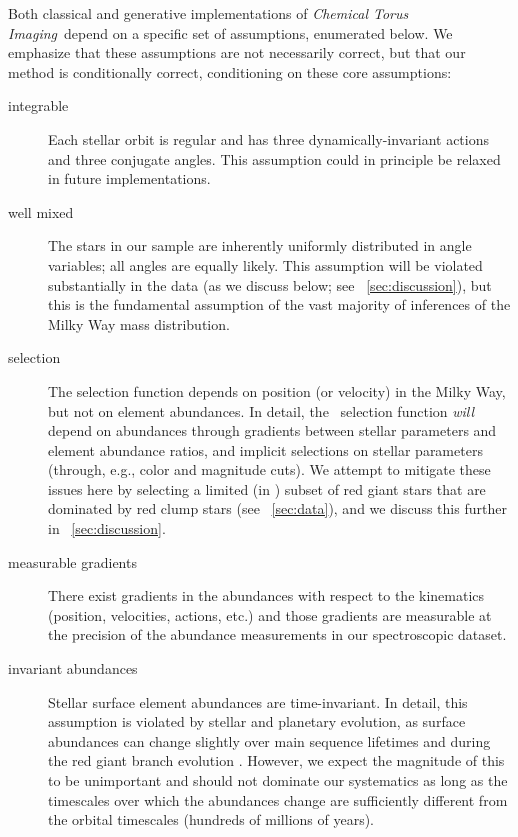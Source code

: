 \documentclass[modern]{aastex63}
\newcommand{\methodname}{\textsl{Chemical Torus Imaging}}
\newcommand{\apogee}{\acronym{APOGEE}}
\begin{document}
Both classical and generative implementations of \methodname\ depend on a
specific set of assumptions, enumerated below.
We emphasize that these assumptions are not necessarily correct, but that our
method is conditionally correct, conditioning on these core assumptions:
\begin{description}
\item[integrable] Each stellar orbit is regular and has three
  dynamically-invariant actions and three conjugate angles. This assumption
  could in principle be relaxed in future implementations.
\item[well mixed] The stars in our sample are inherently uniformly distributed
  in angle variables; all angles are equally likely. This assumption will be
  violated substantially in the data (as we discuss below; see
  \sectionname~\ref{sec:discussion}), but this is the fundamental assumption of
  the vast majority of inferences of the Milky Way mass distribution.
\item[selection] The selection function depends on position (or velocity) in the
  Milky Way, but not on element abundances. In detail, the \apogee\ selection
  function \emph{will} depend on abundances through gradients between stellar
  parameters and element abundance ratios, and implicit selections on stellar
  parameters (through, e.g., color and magnitude cuts). We attempt to mitigate
  these issues here by selecting a limited (in \logg) subset of red giant stars
  that are dominated by red clump stars (see \sectionname~\ref{sec:data}), and
  we discuss this further in \sectionname~\ref{sec:discussion}.
\item[measurable gradients] There exist gradients in the abundances with respect
  to the kinematics (position, velocities, actions, etc.) and those gradients
  are measurable at the precision of the abundance measurements in our
  spectroscopic dataset.
\item[invariant abundances] Stellar surface element abundances are
  time-invariant. In detail, this assumption is violated by stellar and
  planetary evolution, as surface abundances can change slightly over main
  sequence lifetimes \citep{TODO} and during the red giant branch evolution
  \citep{TODO}. However, we expect the magnitude of this to be unimportant and
  should not dominate our systematics as long as the timescales over which the
  abundances change are sufficiently different from the orbital timescales
  (hundreds of millions of years).
\end{description}
\end{document}
